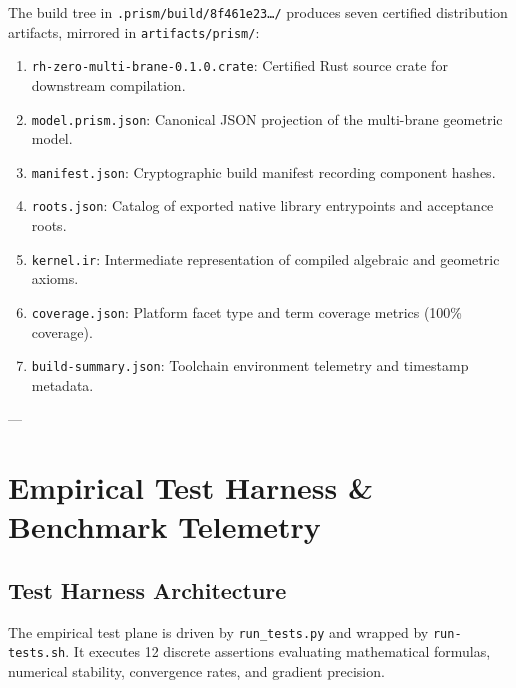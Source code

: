 \documentclass[11pt,a4paper]{article}
\theoremstyle{definition}
\theoremstyle{remark}
\begin{document}
The build tree in \texttt{.prism/build/8f461e23\dots/} produces seven certified distribution artifacts, mirrored in \texttt{artifacts/prism/}:
\begin{enumerate}
    \item \texttt{rh-zero-multi-brane-0.1.0.crate}: Certified Rust source crate for downstream compilation.
    \item \texttt{model.prism.json}: Canonical JSON projection of the multi-brane geometric model.
    \item \texttt{manifest.json}: Cryptographic build manifest recording component hashes.
    \item \texttt{roots.json}: Catalog of exported native library entrypoints and acceptance roots.
    \item \texttt{kernel.ir}: Intermediate representation of compiled algebraic and geometric axioms.
    \item \texttt{coverage.json}: Platform facet type and term coverage metrics (100\% coverage).
    \item \texttt{build-summary.json}: Toolchain environment telemetry and timestamp metadata.
\end{enumerate}

---

\section{Empirical Test Harness \& Benchmark Telemetry}

\subsection{Test Harness Architecture}
The empirical test plane is driven by \texttt{run\_tests.py} and wrapped by \texttt{run-tests.sh}. It executes 12 discrete assertions evaluating mathematical formulas, numerical stability, convergence rates, and gradient precision.
\end{document}
